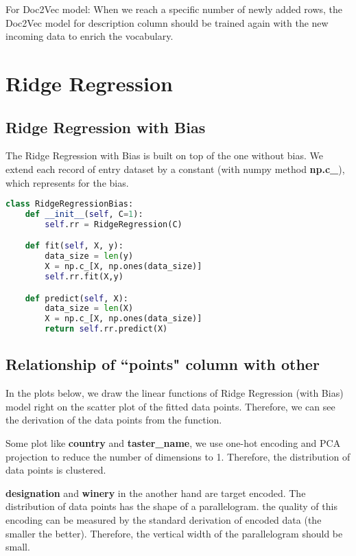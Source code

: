 \documentclass[11pt]{article}
\begin{document}
For Doc2Vec model: When we reach a specific number of newly added rows, the Doc2Vec model for description column should be trained again with the new incoming data to enrich the vocabulary.
\section{Ridge Regression}

\subsection{Ridge Regression with Bias}

The Ridge Regression with Bias is built on top of the one without bias. We extend each record of entry dataset by a constant (with numpy method \textbf{np.c\_}), which represents for the bias.

\begin{lstlisting}[language=python, caption=KNN class]
    class RidgeRegressionBias:
    def __init__(self, C=1):
        self.rr = RidgeRegression(C)

    def fit(self, X, y):
        data_size = len(y)
        X = np.c_[X, np.ones(data_size)]
        self.rr.fit(X,y)

    def predict(self, X):
        data_size = len(X)
        X = np.c_[X, np.ones(data_size)]
        return self.rr.predict(X)
\end{lstlisting}

\subsection{Relationship of ``points" column with other}

In the plots below, we draw the linear functions of Ridge Regression (with Bias) model right on the scatter plot of the fitted data points. Therefore, we can see the derivation of the data points from the function.

Some plot like \textbf{country} and \textbf{taster\_name}, we use one-hot encoding and PCA projection to reduce the number of dimensions to 1. Therefore, the distribution of data points is clustered.

\textbf{designation} and \textbf{winery} in the another hand are target encoded. The distribution of data points has the shape of a parallelogram. the quality of this encoding can be measured by the standard derivation of encoded data (the smaller the better). Therefore, the vertical width of the parallelogram should be small.
\end{document}
